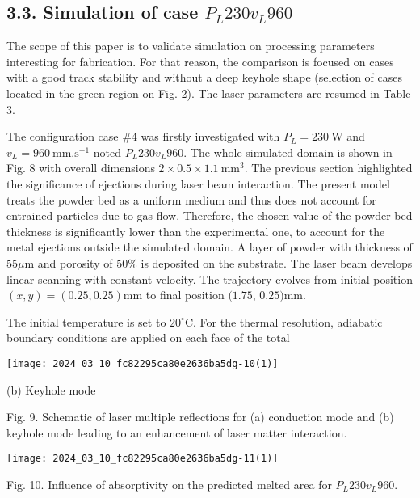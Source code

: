 \documentclass[10pt]{article}
\begin{document}
\subsection*{3.3. Simulation of case $P_{L} 230 v_{L} 960$}
The scope of this paper is to validate simulation on processing parameters interesting for fabrication. For that reason, the comparison is focused on cases with a good track stability and without a deep keyhole shape (selection of cases located in the green region on Fig. 2). The laser parameters are resumed in Table 3.

The configuration case \#4 was firstly investigated with $P_{L}=230 \mathrm{~W}$ and $v_{L}=960 \mathrm{~mm} . \mathrm{s}^{-1}$ noted $P_{L} 230 v_{L} 960$. The whole simulated domain is shown in Fig. 8 with overall dimensions $2 \times 0.5 \times 1.1 \mathrm{~mm}^{3}$. The previous section highlighted the significance of ejections during laser beam interaction. The present model treats the powder bed as a uniform medium and thus does not account for entrained particles due to gas flow. Therefore, the chosen value of the powder bed thickness is significantly lower than the experimental one, to account for the metal ejections outside the simulated domain. A layer of powder with thickness of $55 \mu \mathrm{m}$ and porosity of $50 \%$ is deposited on the substrate. The laser beam develops linear scanning with constant velocity. The trajectory evolves from initial position $(x, y)=(0.25,0.25) \mathrm{mm}$ to final position $(1.75$, $0.25) \mathrm{mm}$.

The initial temperature is set to $20^{\circ} \mathrm{C}$. For the thermal resolution, adiabatic boundary conditions are applied on each face of the total

\begin{center}
\texttt{[image: 2024\_03\_10\_fc82295ca80e2636ba5dg-10(1)]}
\end{center}

(b) Keyhole mode

Fig. 9. Schematic of laser multiple reflections for (a) conduction mode and (b) keyhole mode leading to an enhancement of laser matter interaction.

\begin{center}
\texttt{[image: 2024\_03\_10\_fc82295ca80e2636ba5dg-11(1)]}
\end{center}

Fig. 10. Influence of absorptivity on the predicted melted area for $P_{L} 230 v_{L} 960$.
\end{document}
